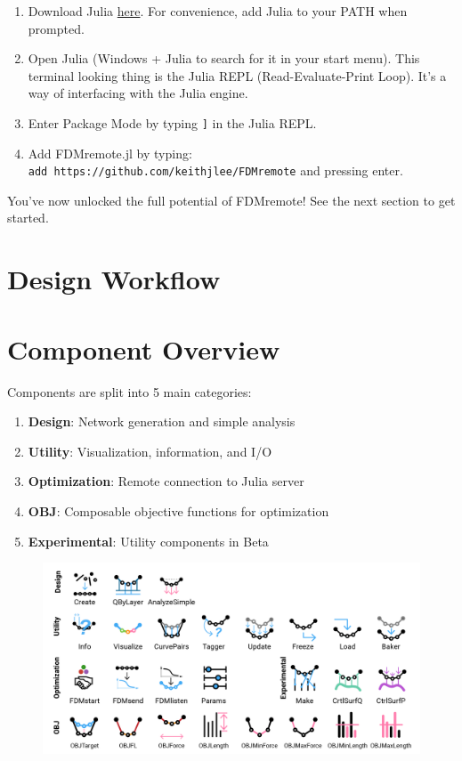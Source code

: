 \documentclass{ol-softwaremanual}
\begin{document}
\begin{enumerate}
    \item Download Julia \href{https://julialang.org/downloads/}{here}. For convenience, add Julia to your PATH when prompted.
    \item Open Julia (Windows + Julia to search for it in your start menu). This terminal looking thing is the Julia REPL (Read-Evaluate-Print Loop). It's a way of interfacing with the Julia engine.
    \item Enter Package Mode by typing \texttt{]} in the Julia REPL.
    \item Add FDMremote.jl by typing:\\ \texttt{add https://github.com/keithjlee/FDMremote} and pressing enter.
\end{enumerate}

 You've now unlocked the full potential of FDMremote! See the next section to get started.

\newpage
\section{Design Workflow} \label{sec:workflow}



\newpage
\section{Component Overview} \label{sec:components}
Components are split into 5 main categories:
\begin{enumerate}
    \item \textbf{Design}: Network generation and simple analysis
    \item \textbf{Utility}: Visualization, information, and I/O
    \item \textbf{Optimization}: Remote connection to Julia server
    \item \textbf{OBJ}: Composable objective functions for optimization
    \item \textbf{Experimental}: Utility components in Beta
\end{enumerate}
\begin{figure}[h]
    \centering
    \includegraphics*[width=\textwidth]{Figures/overview}
\end{figure}


\end{document}
